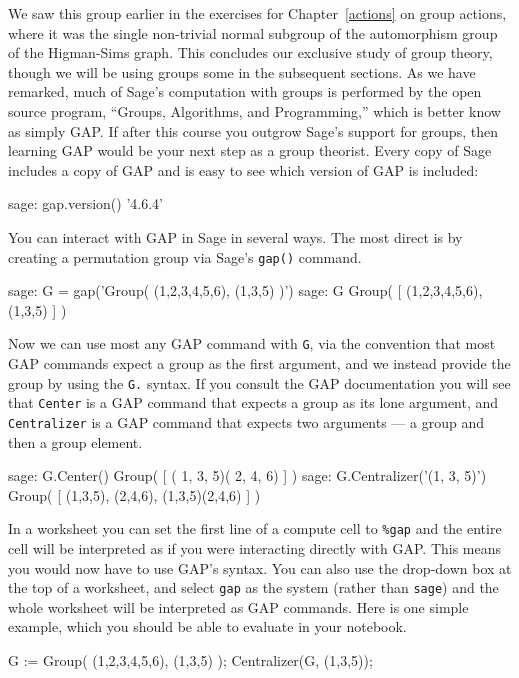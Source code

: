 %
We saw this group earlier in the exercises for Chapter~\ref{actions} on group actions, where it was the single non-trivial normal subgroup of the automorphism group of the Higman-Sims graph.
%
%
This concludes our exclusive study of group theory, though we will be using groups some in the subsequent sections.  As we have remarked, much of Sage's computation with groups is performed by the open source program, ``Groups, Algorithms, and Programming,'' which is better know as simply GAP.  If after this course you outgrow Sage's support for groups, then learning GAP would be your next step as a group theorist. Every copy of Sage includes a copy of GAP and is easy to see which version of GAP is included:
%
\begin{sageexample}
sage: gap.version()
'4.6.4'
\end{sageexample}
%
You can interact with GAP in Sage in several ways. The most direct is by creating a permutation group via Sage's \verb?gap()? command.
%
\begin{sageexample}
sage: G = gap('Group( (1,2,3,4,5,6), (1,3,5) )')
sage: G
Group( [ (1,2,3,4,5,6), (1,3,5) ] )
\end{sageexample}
%
Now we can use most any GAP command with \verb?G?, via the convention that most GAP commands expect a group as the first argument, and we instead provide the group by using the \verb?G.? syntax.  If you consult the GAP documentation you will see that \verb?Center? is a GAP command that expects a group as its lone argument, and \verb?Centralizer? is a GAP command that expects two arguments --- a group and then a group element.
%
\begin{sageexample}
sage: G.Center()
Group( [ ( 1, 3, 5)( 2, 4, 6) ] )
sage: G.Centralizer('(1, 3, 5)')
Group( [ (1,3,5), (2,4,6), (1,3,5)(2,4,6) ] )
\end{sageexample}
%
In a worksheet you can set the first line of a compute cell to \verb?%gap? and the entire cell will be interpreted as if you were interacting directly with GAP.  This means you would now have to use GAP's syntax.  You can also use the drop-down box at the top of a worksheet, and select \verb?gap? as the system (rather than \verb?sage?) and the whole worksheet will be interpreted as GAP commands.  Here is one simple example, which you should be able to evaluate in your notebook.
%
\begin{sageverbatim}
G := Group( (1,2,3,4,5,6), (1,3,5) );
Centralizer(G, (1,3,5));
\end{sageverbatim}

